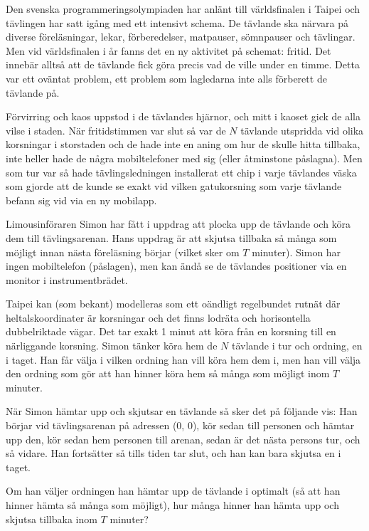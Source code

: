 Den svenska programmeringsolympiaden har anlänt till världsfinalen i Taipei och tävlingen har satt igång med ett intensivt schema. De tävlande ska närvara på diverse föreläsningar, lekar, förberedelser, matpauser, sömnpauser och tävlingar. Men vid världsfinalen i år fanns det en ny aktivitet på schemat: fritid. Det innebär alltså att de tävlande fick göra precis vad de ville under en timme. Detta var ett oväntat problem, ett problem som lagledarna inte alls förberett de tävlande på.

Förvirring och kaos uppstod i de tävlandes hjärnor, och mitt i kaoset gick de alla vilse i staden. När fritidstimmen var slut så var de $N$ tävlande utspridda vid olika korsningar i storstaden och de hade inte en aning om hur de skulle hitta tillbaka, inte heller hade de några mobiltelefoner med sig (eller åtminstone påslagna). Men som tur var så hade tävlingsledningen installerat ett chip i varje tävlandes väska som gjorde att de kunde se exakt vid vilken gatukorsning som varje tävlande befann sig vid via en ny mobilapp.

Limousinföraren Simon har fått i uppdrag att plocka upp de tävlande och köra dem till tävlingsarenan. Hans uppdrag är att skjutsa tillbaka så många som möjligt innan nästa föreläsning börjar (vilket sker om $T$ minuter). Simon har ingen mobiltelefon (påslagen), men kan ändå se de tävlandes positioner via en monitor i instrumentbrädet.

Taipei kan (som bekant) modelleras som ett oändligt regelbundet rutnät där heltalskoordinater är korsningar och det finns lodräta och horisontella dubbelriktade vägar. Det tar exakt 1 minut att köra från en korsning till en närliggande korsning. Simon tänker köra hem de $N$ tävlande i tur och ordning, en i taget. Han får välja i vilken ordning han vill köra hem dem i, men han vill välja den ordning som gör att han hinner köra hem så många som möjligt inom $T$ minuter.

När Simon hämtar upp och skjutsar en tävlande så sker det på följande vis: Han börjar vid tävlingsarenan på adressen (0, 0), kör sedan till personen och hämtar upp den, kör sedan hem personen till arenan, sedan är det nästa persons tur, och så vidare. Han fortsätter så tills tiden tar slut, och han kan bara skjutsa en i taget.

Om han väljer ordningen han hämtar upp de tävlande i optimalt (så att han hinner hämta så många som möjligt), hur många hinner han hämta upp och skjutsa tillbaka inom $T$ minuter?

